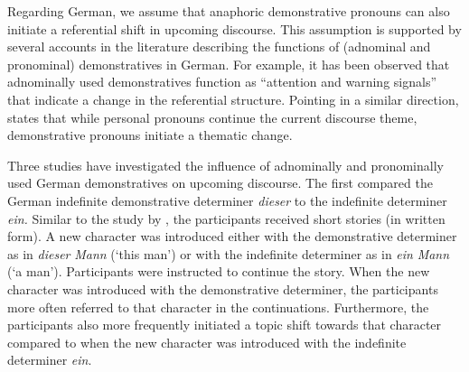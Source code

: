 \documentclass[output=paper,colorlinks,citecolor=brown]{langscibook}
\begin{document}
Regarding German, we assume that anaphoric demonstrative pronouns can also initiate a referential shift in upcoming discourse. This assumption is supported by several accounts in the literature describing the functions of (adnominal and pronominal) demonstratives in German. For example, it has been observed that adnominally used demonstratives function as “attention and warning signals” \citep[441]{Weinrich1993} that indicate a change in the referential structure. Pointing in a similar direction, \citet{Abraham2002} states that while personal pronouns continue the current discourse theme, demonstrative pronouns initiate a thematic change. 

Three studies have investigated the influence of adnominally and pronominally used German demonstratives on upcoming discourse. The first \citep{DeichselvonHeusinger2011} compared the German indefinite demonstrative determiner \textit{dieser} to the indefinite determiner \textit{ein.} Similar to the study by \citet{GernsbacherShroyer1989}, the participants received short stories (in written form). A new character was introduced either with the demonstrative determiner as in \textit{dieser} \textit{Mann} (‘this man’) or with the indefinite determiner as in \textit{ein} \textit{Mann} (‘a man’). Participants were instructed to continue the story. When the new character was introduced with the demonstrative determiner, the participants more often referred to that character in the continuations. Furthermore, the participants also more frequently initiated a topic shift towards that character compared to when the new character was introduced with the indefinite determiner \textit{ein}. 
\end{document}
